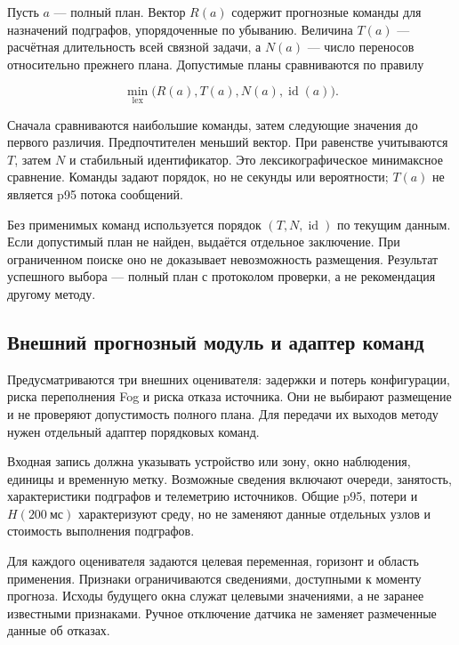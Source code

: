 Пусть \(a\) --- полный план. Вектор \(R(a)\) содержит прогнозные команды для назначений подграфов, упорядоченные по убыванию. Величина \(T(a)\) --- расчётная длительность всей связной задачи, а \(N(a)\) --- число переносов относительно прежнего плана. Допустимые планы сравниваются по правилу

\begin{equation}\label{eq:8}
\min_{\mathrm{lex}}\bigl(R(a),T(a),N(a),\operatorname{id}(a)\bigr).
\end{equation}

Сначала сравниваются наибольшие команды, затем следующие значения до первого различия. Предпочтителен меньший вектор. При равенстве учитываются \(T\), затем \(N\) и стабильный идентификатор. Это лексикографическое минимаксное сравнение. Команды задают порядок, но не секунды или вероятности; \(T(a)\) не является p95 потока сообщений.

Без применимых команд используется порядок \((T,N,\operatorname{id})\) по текущим данным. Если допустимый план не найден, выдаётся отдельное заключение. При ограниченном поиске оно не доказывает невозможность размещения. Результат успешного выбора --- полный план с протоколом проверки, а не рекомендация другому методу.

\hypertarget{ux432ux43dux435ux448ux43dux438ux439-ux43fux440ux43eux433ux43dux43eux437ux43dux44bux439-ux43cux43eux434ux443ux43bux44c-ux438-ux430ux434ux430ux43fux442ux435ux440-ux43aux43eux43cux430ux43dux434}{%
\subsection{Внешний прогнозный модуль и адаптер команд}}

Предусматриваются три внешних оценивателя: задержки и потерь конфигурации, риска переполнения Fog и риска отказа источника. Они не выбирают размещение и не проверяют допустимость полного плана. Для передачи их выходов методу нужен отдельный адаптер порядковых команд.

Входная запись должна указывать устройство или зону, окно наблюдения, единицы и временную метку. Возможные сведения включают очереди, занятость, характеристики подграфов и телеметрию источников. Общие p95, потери и \(H(200\ \text{мс})\) характеризуют среду, но не заменяют данные отдельных узлов и стоимость выполнения подграфов.

Для каждого оценивателя задаются целевая переменная, горизонт и область применения. Признаки ограничиваются сведениями, доступными к моменту прогноза. Исходы будущего окна служат целевыми значениями, а не заранее известными признаками. Ручное отключение датчика не заменяет размеченные данные об отказах.

